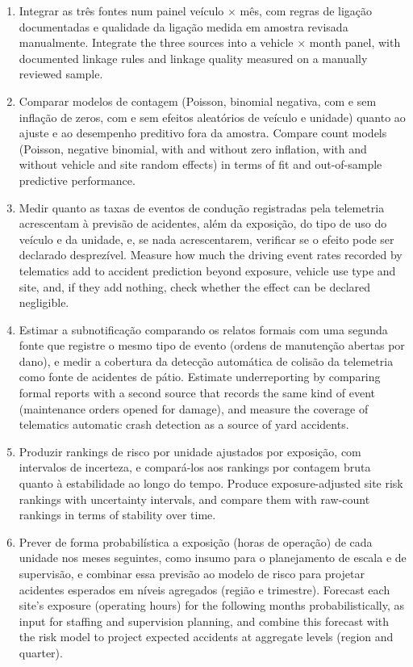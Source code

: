 \begin{enumerate}[label=(\alph*)]
  \item \tr%
    {Integrar as três fontes num painel veículo $\times$ mês, com regras de ligação documentadas e qualidade da ligação medida em amostra revisada manualmente.}%
    {Integrate the three sources into a vehicle $\times$ month panel, with documented linkage rules and linkage quality measured on a manually reviewed sample.}
  \item \tr%
    {Comparar modelos de contagem (Poisson, binomial negativa, com e sem inflação de zeros, com e sem efeitos aleatórios de veículo e unidade) quanto ao ajuste e ao desempenho preditivo fora da amostra.}%
    {Compare count models (Poisson, negative binomial, with and without zero inflation, with and without vehicle and site random effects) in terms of fit and out-of-sample predictive performance.}
  \item \tr%
    {Medir quanto as taxas de eventos de condução registradas pela telemetria acrescentam à previsão de acidentes, além da exposição, do tipo de uso do veículo e da unidade, e, se nada acrescentarem, verificar se o efeito pode ser declarado desprezível.}%
    {Measure how much the driving event rates recorded by telematics add to accident prediction beyond exposure, vehicle use type and site, and, if they add nothing, check whether the effect can be declared negligible.}
  \item \tr%
    {Estimar a subnotificação comparando os relatos formais com uma segunda fonte que registre o mesmo tipo de evento (ordens de manutenção abertas por dano), e medir a cobertura da detecção automática de colisão da telemetria como fonte de acidentes de pátio.}%
    {Estimate underreporting by comparing formal reports with a second source that records the same kind of event (maintenance orders opened for damage), and measure the coverage of telematics automatic crash detection as a source of yard accidents.}
  \item \tr%
    {Produzir rankings de risco por unidade ajustados por exposição, com intervalos de incerteza, e compará-los aos rankings por contagem bruta quanto à estabilidade ao longo do tempo.}%
    {Produce exposure-adjusted site risk rankings with uncertainty intervals, and compare them with raw-count rankings in terms of stability over time.}
  \item \textit{} \tr%
    {Prever de forma probabilística a exposição (horas de operação) de cada unidade nos meses seguintes, como insumo para o planejamento de escala e de supervisão, e combinar essa previsão ao modelo de risco para projetar acidentes esperados em níveis agregados (região e trimestre).}%
    {Forecast each site's exposure (operating hours) for the following months probabilistically, as input for staffing and supervision planning, and combine this forecast with the risk model to project expected accidents at aggregate levels (region and quarter).}
\end{enumerate}

